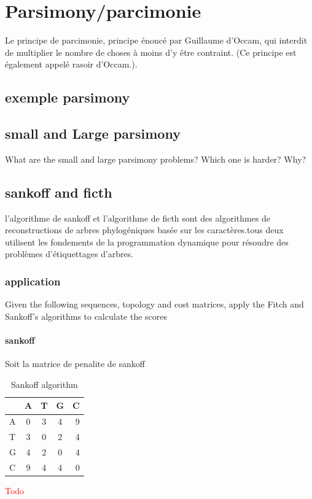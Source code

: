 \section{Parsimony/parcimonie}

Le principe de parcimonie, principe \'{e}nonc\'{e} par Guillaume d'Occam, qui interdit
    de multiplier le nombre de choses \`{a} moins d'y \^{e}tre contraint. (Ce principe est \'{e}galement appel\'{e} rasoir d'Occam.)\cite{larousse01}.

\subsection{exemple parsimony}

\subsection{small and Large parsimony}
What are the small and large parsimony problems? Which one is harder? Why?




\subsection{sankoff and ficth}
l'algorithme de sankoff et l'algorithme de ficth sont des algorithmes de reconstructions de arbres phylog\'{e}niques bas\'{e}e sur les caract\`{e}res.tous deux utilisent les fondements de la programmation dynamique pour r\'{e}soudre des probl\`{e}mes d'étiquettages d'arbres.
\subsubsection*{application}

Given  the  following  sequences,  topology and cost matrices,  apply the Fitch  and
Sankoff’s algorithms to calculate the scores

\paragraph{sankoff}
Soit la matrice de penalite de sankoff \\
\begin{table}[!h]
  \centering
\begin{tabular}{|l|c|c|c|r|}
\hline
    & A & T & G & C \\
  \hline
  A  & 0 & 3 & 4 & 9 \\
	\hline
	T  & 3 & 0 & 2 & 4 \\
	\hline
  G  & 4 & 2 & 0 & 4 \\
  \hline
  C  & 9 & 4 & 4 & 0 \\
  \hline
\end{tabular}
	\caption{Sankoff algorithm}
	\label{tab:commands}
\end{table}
\textcolor{red}{Todo}
